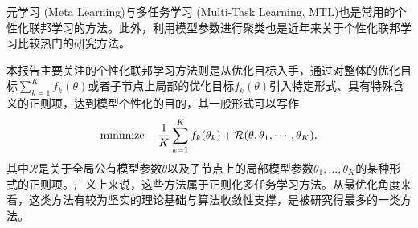 元学习 (Meta Learning)\cite{jiang2019improving, fallah2020personalized, chen2018_fml}与多任务学习 (Multi-Task Learning, MTL)\cite{Smith2017_fl_mtl, smith2017mocha, zhang2021fomo}也是常用的个性化联邦学习的方法。此外，利用模型参数进行聚类\cite{Sattler_2021_cfl, Yu_2024_FPFC, Ghosh_2022_cfl, Zhang_2023_fedmds}也是近年来关于个性化联邦学习比较热门的研究方法。

本报告主要关注的个性化联邦学习方法则是从优化目标入手，通过对整体的优化目标$\sum\limits_{k=1}^K f_k(\theta)$或者子节点上局部的优化目标$f_k(\theta)$引入特定形式、具有特殊含义的正则项，达到模型个性化的目的\cite{hanzely2020federated,t2020pfedme,deng2020_apfl,dinh2021fedu,li2021pfedmac,li_2021_ditto,acar2021feddyn}，其一般形式可以写作
\begin{equation}
\label{eq:pfl-general}
\operatorname*{minimize} \quad \frac{1}{K}\sum\limits_{k=1}^K f_k(\theta_k) + \mathcal{R}(\theta, \theta_1, \cdots, \theta_K),
\end{equation}
其中$\mathcal{R}$是关于全局公有模型参数$\theta$以及子节点上的局部模型参数$\theta_1, \ldots, \theta_K$的某种形式的正则项。广义上来说，这些方法属于正则化多任务学习方法\cite{Caruana_1997_mtl, evgeniou2004regularized}。从最优化角度来看，这类方法有较为坚实的理论基础与算法收敛性支撑，是被研究得最多的一类方法。
